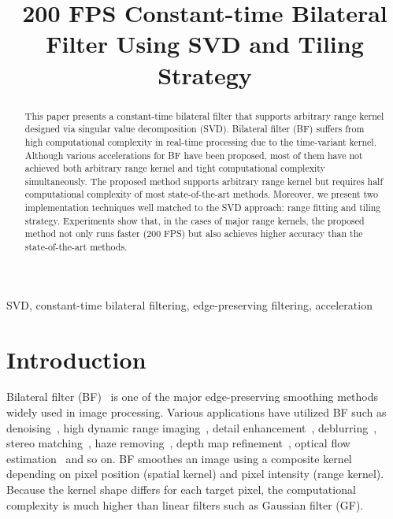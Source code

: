 \documentclass{article}
\title{200 FPS Constant-time Bilateral Filter Using SVD and Tiling Strategy}
\begin{document}
%
\maketitle
%
\begin{abstract}
This paper presents a constant-time bilateral filter that supports arbitrary range kernel designed via singular value decomposition (SVD). 
Bilateral filter (BF) suffers from high computational complexity in real-time processing due to the time-variant kernel.
Although various accelerations for BF have been proposed, most of them have not achieved both arbitrary range kernel and tight computational complexity simultaneously.
The proposed method supports arbitrary range kernel but requires half computational complexity of most state-of-the-art methods.
Moreover, we present two implementation techniques well matched to the SVD approach: range fitting and tiling strategy.
Experiments show that, in the cases of major range kernels, the proposed method not only runs faster (200 FPS) but also achieves higher accuracy than the state-of-the-art methods.
\end{abstract}
%
\begin{keywords}
SVD, constant-time bilateral filtering, edge-preserving filtering, acceleration
\end{keywords}
%
\section{Introduction}
\label{s.introduction}
Bilateral filter (BF)~\cite{tomasi1998bilateral,elad2002origin} is one of the major edge-preserving smoothing methods widely used in image processing.
Various applications have utilized BF such as denoising~\cite{zhang2008multiresolution}, high dynamic range imaging~\cite{durand2002fast}, detail enhancement~\cite{farbman2008edge}, deblurring~\cite{dai2007bilateral,cho2009fast}, stereo matching~\cite{matsuo2015efficient}, haze removing~\cite{fukushima2018guided}, depth map refinement~\cite{matsuo2013weighted}, optical flow estimation~\cite{fujita2015cost} and so on.
BF smoothes an image using a composite kernel depending on pixel position (spatial kernel) and pixel intensity (range kernel).
Because the kernel shape differs for each target pixel, the computational complexity is much higher than linear filters such as Gaussian filter (GF).
\end{document}
